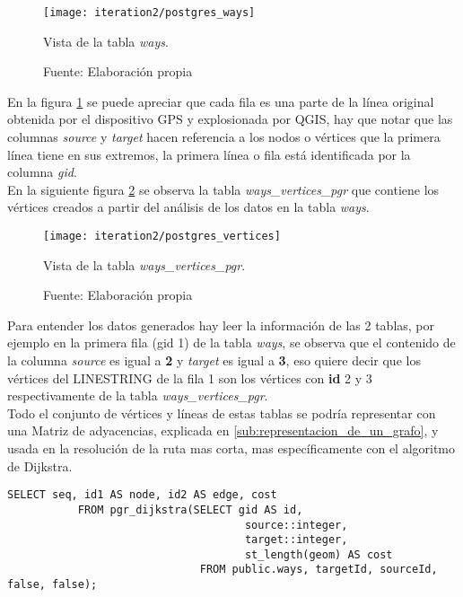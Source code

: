        \begin{figure}[H]
         \begin{center}
           \texttt{[image: iteration2/postgres\_ways]}
           \caption{Vista de la tabla \emph{ways}.}
           \label{fig:postgres_ways}
           \caption*{Fuente: Elaboración propia}
         \end{center}
       \end{figure}

       En la figura \ref{fig:postgres_ways} se puede apreciar que cada fila es una parte de la línea original obtenida por el dispositivo GPS y explosionada por QGIS, hay que notar que las columnas \emph{source} y \emph{target} hacen referencia a los nodos o vértices que la primera línea tiene en sus extremos, la primera línea o fila está identificada por la columna \emph{gid}.\\

       En la siguiente figura \ref{fig:postgres_vertices} se observa la tabla \emph{ways\_vertices\_pgr} que contiene los vértices creados a partir del análisis de los datos en la tabla \emph{ways}.

       \begin{figure}[H]
         \begin{center}
           \texttt{[image: iteration2/postgres\_vertices]}
           \caption{Vista de la tabla \emph{ways\_vertices\_pgr}.}
           \label{fig:postgres_vertices}
           \caption*{Fuente: Elaboración propia}
         \end{center}
       \end{figure}

       Para entender los datos generados hay leer la información de las 2 tablas, por ejemplo en la primera  fila (gid 1) de la tabla \emph{ways}, se observa que el contenido de la columna \emph{source} es igual a \textbf{2} y \emph{target} es igual a \textbf{3}, eso quiere decir que los vértices del LINESTRING de la fila 1 son los vértices con \textbf{id} 2 y 3 respectivamente de la tabla \emph{ways\_vertices\_pgr}.\\


       Todo el conjunto de vértices y líneas de estas tablas se podría representar con una Matriz de adyacencias, explicada en \ref{sub:representacion_de_un_grafo}, y usada en la resolución de la ruta mas corta, mas específicamente con el algoritmo de Dijkstra.\\

       \begin{center}
         \begin{lstlisting}[label=pgr_dijkstra,caption=Algoritmo de Dijkstra implementado en \emph{pgRouting}]
           SELECT seq, id1 AS node, id2 AS edge, cost
           FROM pgr_dijkstra(SELECT gid AS id,
                                     source::integer,
                                     target::integer,
                                     st_length(geom) AS cost
                              FROM public.ways, targetId, sourceId, false, false);
         \end{lstlisting}
       \end{center}


